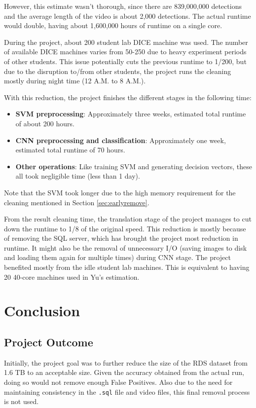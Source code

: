 \documentclass[bsc,logo,twoside,fullspacing,parskip]{infthesis}
\begin{document}
However, this estimate wasn't thorough, since there are 839,000,000 detections and the average length of the video is about 2,000 detections.
The actual runtime would double, having about 1,600,000 hours of runtime on a single core. 

During the project, about 200 student lab DICE machine was used. 
The number of available DICE machines varies from 50-250 due to heavy experiment periods of other students.
This issue potentially cuts the previous runtime to 1/200, but due to the disruption to/from other students, the project runs the cleaning mostly during night time (12 A.M. to 8 A.M.).

With this reduction, the project finishes the different stages in the following time:
\begin{itemize}
\setlength{\parskip}{-1pt}
\item \textbf{SVM preprocessing}: Approximately three weeks, estimated total runtime of about 200 hours. 
\item \textbf{CNN preprocessing and classification}: Approximately one week, estimated total runtime of 70 hours. 
\item \textbf{Other operations}: Like training SVM and generating decision vectors, these all took negligible time (less than 1 day). 
\end{itemize}
Note that the SVM took longer due to the high memory requirement for the cleaning mentioned in Section \ref{sec:earlyremove}.

From the result cleaning time, the translation stage of the project manages to cut down the runtime to 1/8 of the original speed.
This reduction is mostly because of removing the SQL server, which has brought the project most reduction in runtime. 
It might also be the removal of unnecessary I/O (saving images to disk and loading them again for multiple times) during CNN stage. 
The project benefited mostly from the idle student lab machines. This is equivalent to having 20 40-core machines used in Yu's estimation.
\newpage

\chapter{Conclusion}
\label{chap:conclusion}

\section{Project Outcome}

Initially, the project goal was to further reduce the size of the RDS dataset from 1.6 TB to an acceptable size. 
Given the accuracy obtained from the actual run, doing so would not remove enough False Positives. Also due to the need for maintaining consistency in the {\tt .sql} file and video files, this final removal process is not used.
\end{document}
